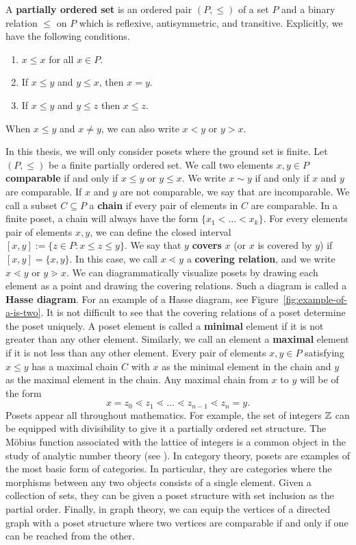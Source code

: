 \documentclass{puthesis-UG}
\begin{document}
\begin{defn}\label{def:poset}
	A \textbf{partially ordered set} is an ordered pair $(P, \leq)$ of a set $P$ and a binary relation $\leq$ on $P$ which is reflexive, antisymmetric, and transitive. Explicitly, we have the following conditions. 
	\begin{enumerate}[label = (\alph*)]
		\item $x \leq x$ for all $x \in P$.
		\item If $x \leq y$ and $y \leq x$, then $x = y$.
		\item If $x \leq y$ and $y \leq z$ then $x \leq z$.
	\end{enumerate}
	When $x \leq y$ and $x \neq y$, we can also write $x < y$ or $y > x$.
\end{defn}

In this thesis, we will only consider posets where the ground set is finite. Let $(P, \leq)$ be a finite partially ordered set. We call two elements $x, y \in P$ \textbf{comparable} if and only if $x \leq y$ or $y \leq x$. We write $x \sim y$ if and only if $x$ and $y$ are comparable. If $x$ and $y$ are not comparable, we say that are incomparable. We call a subset $C \subseteq P$ a \textbf{chain} if every pair of elements in $C$ are comparable. In a finite poset, a chain will always have the form $\{x_1 < \ldots < x_k\}$. For every elements pair of elements $x, y$, we can define the closed interval $[x, y] := \{z \in P : x \leq z \leq y\}$. We say that $y$ \textbf{covers} $x$ (or $x$ is covered by $y$) if $[x, y] = \{x, y\}$. In this case, we call $x \lessdot y$ a \textbf{covering relation}, and we write $x \lessdot y$ or $y \gtrdot x$. We can diagrammatically visualize posets by drawing each element as a point and drawing the covering relations. Such a diagram is called a \textbf{Hasse diagram}. For an example of a Hasse diagram, see Figure~\ref{fig:example-of-a-is-two}. It is not difficult to see that the covering relations of a poset determine the poset uniquely. A poset element is called a \textbf{minimal} element if it is not greater than any other element. Similarly, we call an element a \textbf{maximal} element if it is not less than any other element. Every pair of elements $x, y \in P$ satisfying $x \leq y$ has a maximal chain $C$ with $x$ as the minimal element in the chain and $y$ as the maximal element in the chain. Any maximal chain from $x$ to $y$ will be of the form 
\[
	x = z_0 \lessdot z_1 \lessdot \ldots \lessdot z_{n-1} \lessdot z_n = y. 
\]
Posets appear all throughout mathematics. For example, the set of integers $\mathbb{Z}$ can be equipped with divisibility to give it a partially ordered set structure. The M\"obius function associated with the lattice of integers is a common object in the study of analytic number theory (see \cite{Apostol2013-an}). In category theory, posets are examples of the most basic form of categories. In particular, they are categories where the morphisms between any two objects consists of a single element. Given a collection of sets, they can be given a poset structure with set inclusion as the partial order. Finally, in graph theory, we can equip the vertices of a directed graph with a poset structure where two vertices are comparable if and only if one can be reached from the other. 
\end{document}
